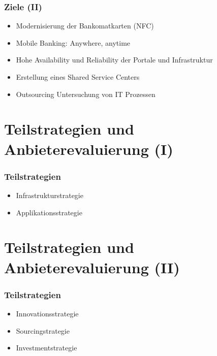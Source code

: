 \documentclass{beamer}
\begin{document}
\begin{frame}
  \frametitle{Ziele (II)}
  \begin{itemize}

	\item Modernisierung der Bankomatkarten (NFC)\vspace{2mm}
	\item Mobile Banking: Anywhere, anytime\vspace{2mm}
	\item Hohe Availability und Reliability der Portale und Infrastruktur\vspace{2mm}
	\item Erstellung eines Shared Service Centers \vspace{2mm}
	\item Outsourcing Untersuchung von IT Prozessen\vspace{2mm}

  \end{itemize}
\end{frame}


\section{Teilstrategien und Anbieterevaluierung (I)}

\begin{frame}
  \frametitle{Teilstrategien}
  \begin{itemize}

	\item Infrastrukturstrategie
	\item Applikationsstrategie
	
  \end{itemize}
\end{frame}

\section{Teilstrategien und Anbieterevaluierung (II)}

\begin{frame}
  \frametitle{Teilstrategien}
  \begin{itemize}

	\item Innovationsstrategie
	\item Sourcingstrategie 
	\item Investmentstrategie
	
  \end{itemize}
\end{frame}
\end{document}
